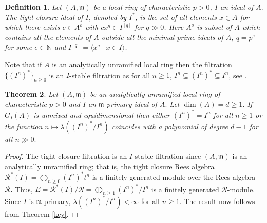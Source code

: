 \documentclass[11pt]{amsart}
\theoremstyle{plain}
\newtheorem{theorem}{Theorem}[section]
\newtheorem{definition}[theorem]{Definition}
\newcommand{\m}{\mathfrak{m}}
\newcommand{\R}{\mathcal{R}}
\newcommand{\N}{\mathbb{N}}
\theoremstyle{plain}
\begin{document}
\begin{definition}
\normalfont
     Let $(A,\m)$ be a local ring of characteristic $p>0$, $I$ an ideal of $A.$ The tight closure ideal of $I$, denoted by ${I}^*$, is  the set of all elements $x\in A$ for which there exists $c\in A^o$ with $cx^q\in I^{[q]}$ for $q\gg0$. Here $A^o$ is subset of $A$ which contains all the elements of $A$ outside all the minimal prime ideals of $A$, $q=p^e$ for some $e\in \N$ and    $I^{[q]}= \langle x^q  \mid x\in I\rangle$.
\end{definition}
Note that if $A$ is an analytically unramified local ring then the filtration $\{({I^n})^*\}_{n\geq 0}$ is an
 $I$-stable filtration as for all $n\geq 1$, $I^n\subseteq ({I^n})^* \subseteq \overline{I^n}$, see \cite[Proposition 10.2.5]{Bruns}.
\begin{theorem}
\label{Thm:tightclosure}
 Let $(A,\m)$ be an analytically unramified local ring of characteristic $p>0$ and $I$ an $\m$-primary ideal of $A.$ Let $\operatorname{dim}(A)=d\geq 1$.  If ${G}_{I}(A)$ is unmixed and equidimensional then either $({I^n})^*=I^n$ for all $n\geq 1$ or the function $n\mapsto\lambda(({I^n})^*/I^n)$ coincides with a polynomial of degree $d-1$ for all $n\gg0.$
\end{theorem}
\begin{proof}
    The tight closure filtration is an $I$-stable filtration since $(A,\m)$ is an analytically unramified ring; that is, the tight closure Rees algebra $\R^*(I)=\bigoplus_{n\geq 0}({I^n})^*t^n$ is a finitely generated module over the Rees algebra $\R.$ Thus, $E=\R^*(I)/\R=\bigoplus_{n\geq 1}({I^n})^*/I^n$ is a finitely generated $\R$-module. Since $I$ is $\m$-primary, $\lambda(({I^n})^*/I^n)<\infty$ for all $n\geq 1.$ The result now follows from Theorem \ref{key}.
\end{proof}
\end{document}
